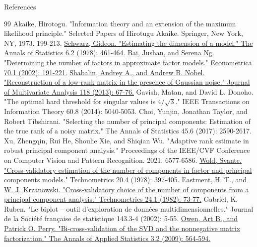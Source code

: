 \documentclass{beamer}
\begin{document}
\begin{frame}{References}
\begin{thebibliography}{99}
     Akaike, Hirotogu. "Information theory and an extension of the maximum likelihood principle." Selected Papers of Hirotugu Akaike. Springer, New York, NY, 1973. 199-213.
     \href{https://doi.org/10.1214/aos/1176344136}{Schwarz, Gideon. "Estimating the dimension of a model." The Annals of Statistics 6.2 (1978): 461-464.}
     \href{https://doi.org/10.1111/1468-0262.00273}{Bai, Jushan, and Serena Ng. "Determining the number of factors in approximate factor models." Econometrica 70.1 (2002): 191-221.}
     \href{https://doi.org/10.1016/j.jmva.2013.03.005}{Shabalin, Andrey A., and Andrew B. Nobel. "Reconstruction of a low-rank matrix in the presence of Gaussian noise." Journal of Multivariate Analysis 118 (2013): 67-76.}
     Gavish, Matan, and David L. Donoho. "The optimal hard threshold for singular values is $4/\sqrt{3}$." IEEE Transactions on Information Theory 60.8 (2014): 5040-5053.
     Choi, Yunjin, Jonathan Taylor, and Robert Tibshirani. "Selecting the number of principal components: Estimation of the true rank of a noisy matrix." The Annals of Statistics 45.6 (2017): 2590-2617.
     Xu, Zhengqin, Rui He, Shoulie Xie, and Shiqian Wu. "Adaptive rank estimate in robust principal component analysis." Proceedings of the IEEE/CVF Conference on Computer Vision and Pattern Recognition. 2021. 6577-6586.
     \href{https://doi.org/10.1080/00401706.1978.10489693}{Wold, Svante. "Cross-validatory estimation of the number of components in factor and principal components models." Technometrics 20.4 (1978): 397-405.}
     \href{https://doi.org/10.2307/1267581}{Eastment, H. T., and W. J. Krzanowski. "Cross-validatory choice of the number of components from a principal component analysis." Technometrics 24.1 (1982): 73-77.}
     Gabriel, K. Ruben. "Le biplot -- outil d'exploration de données multidimensionnelles." Journal de la Société française de statistique 143.3-4 (2002): 5-55.
     \href{https://doi.org/10.1214/08-AOAS227}{Owen, Art B., and Patrick O. Perry. "Bi-cross-validation of the SVD and the nonnegative matrix factorization." The Annals of Applied Statistics 3.2 (2009): 564-594.}

\end{thebibliography}
\end{frame}
\end{document}
